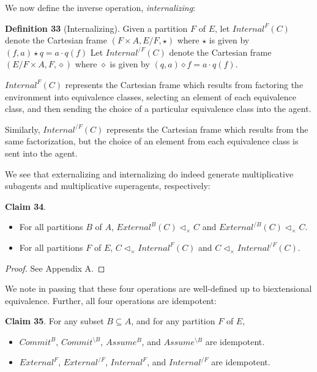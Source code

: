 \documentclass{article}
\begin{document}
We now define the inverse operation, \emph{internalizing}:

\bigskip
\noindent \textbf{Definition 33} (Internalizing).
Given a partition $F$ of $E$, let $Internal^F (C)$ denote the Cartesian frame $(F \times A, E/F, \star)$ where $\star$ is given by $(f, a) \star q = a \cdot q(f)$
Let $Internal^{/F} (C)$ denote the Cartesian frame $(E/F \times A, F, \diamond)$ where $\diamond$ is given by $(q, a) \diamond f = a \cdot q(f)$. 

\bigskip
\noindent $Internal^F (C)$ represents the Cartesian frame which results from factoring the environment into equivalence classes, selecting an element of each equivalence class, and then sending the choice of a particular equivalence class into the agent.

Similarly, $Internal^{/F} (C)$ represents the Cartesian frame which results from the same factorization, but the choice of an element from each equivalence class is sent into the agent.

We see that externalizing and internalizing do indeed generate multiplicative subagents and multiplicative superagents, respectively:

\bigskip
\noindent \textbf{Claim 34}. \label{claim:externintern}
\begin{itemize}
    \item For all partitions $B$ of $A$, $External^B (C) \triangleleft_{\times} C$ and $External^{/B} (C) \triangleleft_{\times} C$.
    \item For all partitions $F$ of $E$, $C \triangleleft_{\times} Internal^F (C)$ and $C \triangleleft_{\times} Internal^{/F} (C)$.
\end{itemize}

\begin{proof}
See Appendix A.
\end{proof}

\noindent We note in passing that these four operations are well-defined up to biextensional equivalence.
Further, all four operations are idempotent:

\bigskip
\noindent \textbf{Claim 35}.
For any subset $B \subseteq A$, and for any partition $F$ of $E$,
\begin{itemize}
    \item $Commit^B$, $Commit^{\setminus B}$, $Assume^B$, and $Assume^{\setminus B}$ are idempotent.
    \item $External^F$, $External^{/F}$, $Internal^F$, and $Internal^{/F}$ are idempotent.
\end{itemize}
\end{document}
